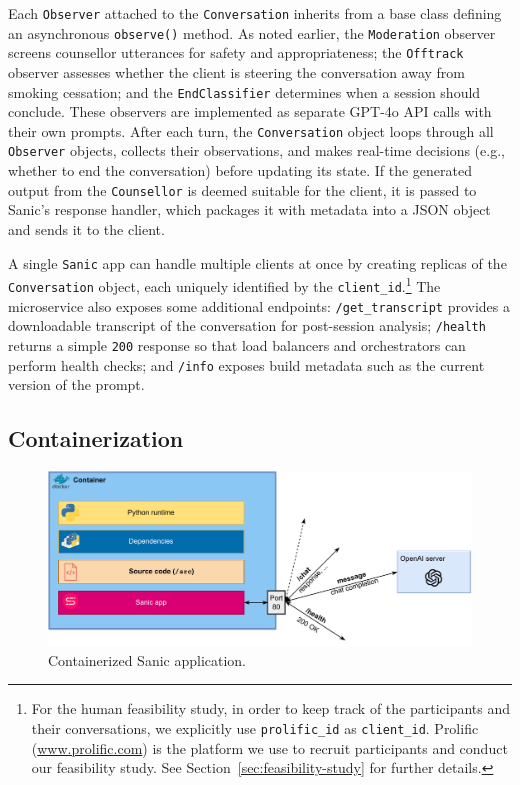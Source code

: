Each \texttt{Observer} attached to the \texttt{Conversation} inherits from a base class defining an asynchronous \texttt{observe()} method. As noted earlier, the \texttt{Moderation} observer screens counsellor utterances for safety and appropriateness; the \texttt{Offtrack} observer assesses whether the client is steering the conversation away from smoking cessation; and the \texttt{EndClassifier} determines when a session should conclude. These observers are implemented as separate GPT-4o API calls with their own prompts. After each turn, the \texttt{Conversation} object loops through all \texttt{Observer} objects, collects their observations, and makes real-time decisions (e.g., whether to end the conversation) before updating its state. If the generated output from the \texttt{Counsellor} is deemed suitable for the client, it is passed to Sanic's response handler, which packages it with metadata into a JSON object and sends it to the client.

A single \texttt{Sanic} app can handle multiple clients at once by creating replicas of the \texttt{Conversation} object, each uniquely identified by the \texttt{client\_id}.\footnote{For the human feasibility study, in order to keep track of the participants and their conversations, we explicitly use \texttt{prolific\_id} as \texttt{client\_id}. Prolific (\url{www.prolific.com}) is the platform we use to recruit participants and conduct our feasibility study. See Section~\ref{sec:feasibility-study} for further details.} The microservice also exposes some additional endpoints: \texttt{/get\_transcript} provides a downloadable transcript of the conversation for post-session analysis; \texttt{/health} returns a simple \texttt{200} response so that load balancers and orchestrators can perform health checks; and \texttt{/info} exposes build metadata such as the current version of the prompt.

\subsection{Containerization}

\begin{figure}[ht]
  \centering
  \includegraphics[width=0.7\linewidth]{fig/container.drawio.pdf} 
  \caption{Containerized Sanic application.}
  \label{fig:containerization}
\end{figure}


